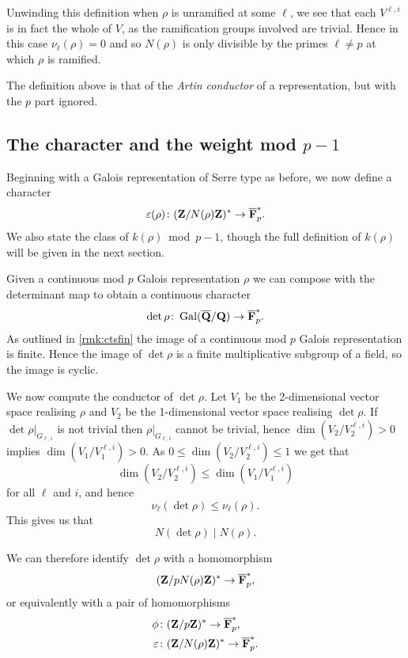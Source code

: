 \documentclass[a4paper,12pt]{article}
\begin{document}
\begin{rmk}\label{rmk:unram}
Unwinding this definition when $\rho$ is unramified at some $\ell$, we see that each $V^{\ell,i}$ is in fact the whole of $V$, as the ramification groups involved are trivial. %
Hence in this case $\nu_\ell(\rho) = 0$ and so $N(\rho)$ is only divisible by the primes $\ell \ne p$ at which $\rho$ is ramified.
\end{rmk}

The definition above is that of the \emph{Artin conductor} of a representation, but with the $p$ part ignored. %


\subsection{The character and the weight mod $p-1$}
Beginning with a Galois representation of Serre type as before, we now define a character
\[
\varepsilon(\rho)\colon  (\mathbf{Z}/N(\rho)\mathbf{Z})^* \to \overline{\mathbf{F}}_p^*.
\]
We also state the class of $k(\rho)$~mod~$p-1$, though the full definition of $k(\rho)$ will be given in the next section.

Given a continuous mod $p$ Galois representation $\rho$ we can compose with the determinant map to obtain a continuous character
\[
\det \rho\colon \operatorname{Gal}(\overline{\mathbf{Q}}/\mathbf{Q}) \to \overline{\mathbf{F}}_p^*.
\]
As outlined in \cref{rmk:ctsfin} the image of a continuous mod $p$ Galois representation is finite.
Hence the image of $\det \rho$ is a finite multiplicative subgroup of a field, so the image is cyclic.

We now compute the conductor of $\det\rho$.
Let $V_1$ be the 2-dimensional vector space realising $\rho$ and $V_2$ be the 1-dimensional vector space realising $\det\rho$.
If $\det\rho|_{G_{\ell, i}}$ is not trivial then $\rho|_{G_{\ell,i}}$ cannot be trivial, hence $\dim(V_2/V_2^{\ell,i}) > 0$ implies $\dim(V_1/V_1^{\ell,i}) > 0$.
As $0 \le \dim(V_2/V_2^{\ell,i}) \le 1$ we get that
\[
\dim(V_2/V_2^{\ell,i})\le \dim(V_1/V_1^{\ell,i})
\]
for all $\ell$ and $i$, and hence
\[
\nu_\ell(\det\rho) \le \nu_\ell(\rho).
\]
This gives us that
\[
N(\det\rho) \mid N(\rho).
\]


We can therefore identify $\det\rho$ with a homomorphism
\[
(\mathbf{Z}/pN(\rho)\mathbf{Z})^* \to \overline{\mathbf{F}}_p^*,
\]
or equivalently with a pair of homomorphisms
\begin{align*}
\phi\colon& (\mathbf{Z}/p\mathbf{Z})^* \to \overline{\mathbf{F}}_p^*,\\
\varepsilon\colon& (\mathbf{Z}/N(\rho)\mathbf{Z})^* \to \overline{\mathbf{F}}_p^*.
\end{align*}
\end{document}
